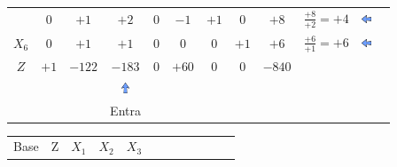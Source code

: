 \begin{frame}
{\begin{table}
\begin{tabular}{c c c c c c c c c c c c}
				& \cellcolor{yellow!50} $\scriptstyle 0$
				& \cellcolor{yellow!50} $\scriptstyle +1$
				& \cellcolor{gray!50} $\scriptstyle +2$
				& \cellcolor{yellow!50} $\scriptstyle 0$			
				& \cellcolor{yellow!50} $\scriptstyle -1$
				& \cellcolor{yellow!50} $\scriptstyle +1$
				& \cellcolor{yellow!50} $\scriptstyle 0$ 
				& \cellcolor{gray!50} $\scriptstyle +8$ 
				& $\scriptstyle \frac{+8}{+2}=+4$ & \includegraphics[width=0.3cm,height=0.3cm]{setaesquerda.jpg} \\
				\cellcolor{blue!100} \color{red} $\scriptstyle X_6$
				& \cellcolor{yellow!50} $\scriptstyle 0$
				& \cellcolor{yellow!50} $\scriptstyle +1$
				& \cellcolor{gray!50} $\scriptstyle +1$
				& \cellcolor{yellow!50} $\scriptstyle 0$
				& \cellcolor{yellow!50} $\scriptstyle 0$
				& \cellcolor{yellow!50} $\scriptstyle 0$
				& \cellcolor{yellow!50} $\scriptstyle +1$
				& \cellcolor{gray!50} $\scriptstyle +6$ 
				& $\scriptstyle \frac{+6}{+1}=+6$ & \includegraphics[width=0.3cm,height=0.3cm]{setaesquerda.jpg}\\
				\cellcolor{blue!100} \color{white} $\scriptstyle Z$
				& \cellcolor{yellow!50} $\scriptstyle +1$
				& \cellcolor{yellow!50} $\scriptstyle -122$
				& \cellcolor{gray!50} $\scriptstyle -183$
				& \cellcolor{yellow!50} $\scriptstyle 0$
				& \cellcolor{yellow!50} $\scriptstyle +60$
				& \cellcolor{yellow!50} $\scriptstyle 0$
				& \cellcolor{yellow!50} $\scriptstyle 0$ 
				& \cellcolor{gray!50} $\scriptstyle -840$  \\
				& & & \includegraphics[width=0.3cm,height=0.3cm]{setacima.jpg} \\
				& & & \scriptsize Entra \\ 
			\end{tabular}
		\end{table}			
	}
	{
		\begin{table}		
			\begin{tabular}{c c c c c c c c c c c c}
				\cline{1-8} 
				\cellcolor{blue!100} \color{white} \scriptsize Base 
				&\cellcolor{blue!100} \color{white} \scriptsize Z 
				&\cellcolor{blue!100} \color{white} $\scriptstyle X_1$ 
				&\cellcolor{blue!100} \color{white} $\scriptstyle X_2$ 
				&\cellcolor{blue!100} \color{red}   $\scriptstyle X_3$ 

\end{tabular}
\end{table}}
\end{frame}
